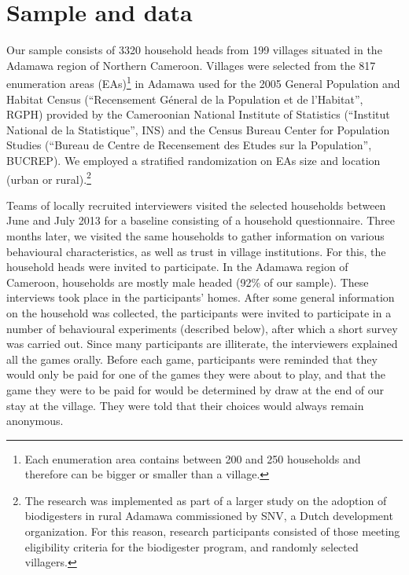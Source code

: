 \section{Sample and data}



Our sample consists of 3320 household heads from 199 villages situated in the Adamawa region of Northern Cameroon. Villages were selected from the 817 enumeration areas (EAs)\footnote{Each enumeration area contains between 200 and 250 households and therefore can be bigger or smaller than a village.} in Adamawa used for the 2005 General Population and Habitat Census (``Recensement Géneral de la Population et de l’Habitat'', RGPH) provided by the Cameroonian National Institute of Statistics (``Institut National de la Statistique'', INS) and the Census Bureau Center for Population Studies (``Bureau de Centre de Recensement des Etudes sur la Population'', BUCREP). We employed a stratified randomization on EAs size and location (urban or rural).\footnote{The research was implemented as part of a larger study on the adoption of biodigesters in rural Adamawa commissioned by SNV, a Dutch development organization. For this reason, research participants consisted of those meeting eligibility criteria for the biodigester program, and randomly selected villagers.} 

Teams of locally recruited interviewers visited the selected households between June and July 2013 for a baseline consisting of a household questionnaire. Three months later, we visited the same households to gather information on various behavioural characteristics, as well as trust in village institutions. For this, the household heads were invited to participate. In the Adamawa region of Cameroon, households are mostly male headed (92\% of our sample). These interviews took place in the participants’ homes. After some general information on the household was collected, the participants were invited to participate in a number of behavioural experiments (described below), after which a short survey was carried out. Since many participants are illiterate, the interviewers explained all the games orally. Before each game, participants were reminded that they would only be paid for one of the games they were about to play, and that the game they were to be paid for would be determined by draw at the end of our stay at the village. They were told that their choices would always remain anonymous. 

